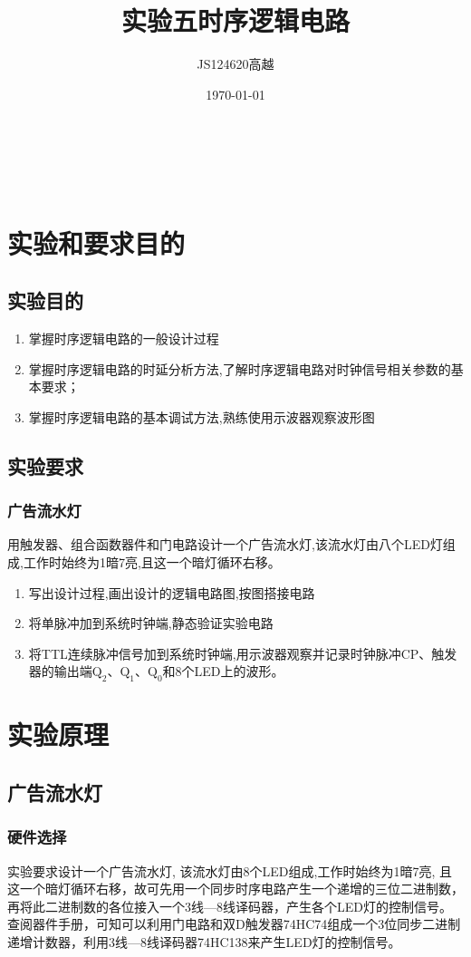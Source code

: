 \documentclass[zihao=-4]{ctexart} %
\title{实验五\quad 时序逻辑电路}
\author{JS124620\quad 高越}
\date{\today} %
\makeatletter
\renewcommand{\maketitle}{
    \begin{center}
        {\zihao{2}\CJKfontspec[FakeBold=3]{SimSun} \@title} \\[0.75em] %
        {\zihao{-4} \@author} \\[0.5em] %
        {\zihao{-4} \@date} %
    \end{center}
}
\makeatother
\begin{document}
\maketitle %

\section{实验和要求目的} %
\subsection{实验目的}
\begin{enumerate}
  \item 掌握时序逻辑电路的一般设计过程
  \item 掌握时序逻辑电路的时延分析方法,了解时序逻辑电路对时钟信号相关参数的基本要求；
  \item 掌握时序逻辑电路的基本调试方法,熟练使用示波器观察波形图 
\end{enumerate}
\subsection{实验要求}
\subsubsection{广告流水灯}
用触发器、组合函数器件和门电路设计一个广告流水灯,该流水灯由八个LED灯组成,工作时始终为1暗7亮,且这一个暗灯循环右移。
\begin{enumerate}
  \item 写出设计过程,画出设计的逻辑电路图,按图搭接电路
  \item 将单脉冲加到系统时钟端,静态验证实验电路 
  \item 将TTL连续脉冲信号加到系统时钟端,用示波器观察并记录时钟脉冲CP、触发器的输出端$\mathrm{Q_2}$、$\mathrm{Q_1}$、$\mathrm{Q_0}$和8个LED上的波形。
\end{enumerate}
\section{实验原理}
\subsection{广告流水灯}
\subsubsection{硬件选择}
实验要求设计一个广告流水灯,
该流水灯由8个LED组成,工作时始终为1暗7亮,
且这一个暗灯循环右移，故可先用一个同步时序电路产生一个递增的三位二进制数，
再将此二进制数的各位接入一个3线—8线译码器，产生各个LED灯的控制信号。
查阅器件手册，可知可以利用门电路和双D触发器74HC74组成一个3位同步二进制递增计数器，利用3线—8线译码器74HC138来产生LED灯的控制信号。
\end{document}
